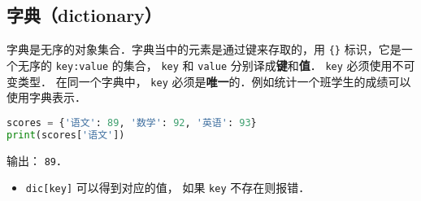 \subsection{字典（dictionary）}
字典是无序的对象集合．字典当中的元素是通过键来存取的，用 \verb|{}| 标识，它是一个无序的 \verb|key:value| 的集合， \verb|key| 和 \verb|value| 分别译成\textbf{键}和\textbf{值}． \verb|key| 必须使用不可变类型． 在同一个字典中， \verb|key| 必须是\textbf{唯一}的．例如统计一个班学生的成绩可以使用字典表示．
\begin{lstlisting}[language=python]
scores = {'语文': 89, '数学': 92, '英语': 93}
print(scores['语文'])
\end{lstlisting}
输出： \verb|89|．

\begin{itemize}
\item \verb|dic[key]| 可以得到对应的值， 如果 \verb|key| 不存在则报错．
\end{itemize}
